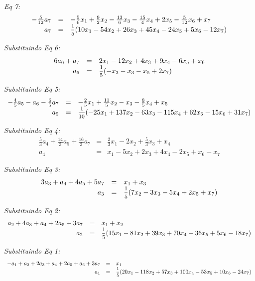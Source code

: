 \documentclass[11pt]{article}
\newenvironment{question}[1]
  {\par\addvspace{\medskipamount}
   \noindent\makebox[0pt][r]{\textbf{#1)} }\ignorespaces}
  {\par\addvspace{\medskipamount}}
\begin{document}
\begin{question}{4}
\bigskip
\textit{Eq 7:}
$$
\begin{array}{rcl}
    -\frac{5}{12}a_7 &= &-\frac{5}{6}x_1 + \frac{9}{2}x_2 - \frac{13}{6}x_3 - \frac{15}{4}x_4 + 2 x_5 - \frac{5}{12}x_6 + x_7\\
    a_7 &= &\mfrac{1}{5}(10x_1-54x_2+26x_3+45x_4-24x_5+5x_6-12x_7)
\end{array}
$$

\bigskip
\textit{Substituindo Eq 6:}
$$
\begin{array}{rcl}
    6a_6 + a_7 &= &2 x_1 - 12 x_2 + 4 x_3 + 9 x_4 - 6 x_5 + x_6\\
    a_6 &= &\mfrac{1}{5}(-x_2-x_3-x_5+2x_7)
\end{array}
$$

\bigskip
\textit{Substituindo Eq 5:}
$$
\begin{array}{rcl}
    -\frac{4}{5}a_5 - a_6 - \frac{6}{5}a_7 &= &-\frac{2}{5}x_1 + \frac{11}{5}x_2 - x_3 - \frac{8}{5}x_4 + x_5\\
    a_5 &= &\mfrac{1}{10}(-25x_1+137x_2-63x_3-115x_4+62x_5-15x_6+31x_7)
\end{array}
$$

\bigskip
\textit{Substituindo Eq 4:}
$$
\begin{array}{rcl}
    \frac{5}{3}a_4 + \frac{14}{3}a_5 + \frac{16}{3}a_7 &= &\frac{2}{3}x_1 - 2 x_2 + \frac{5}{3}x_3 + x_4\\
    a_4 &= &x_1-5x_2+2x_3+4x_4-2x_5+x_6-x_7
\end{array}
$$

\bigskip
\textit{Substituindo Eq 3:}
$$
\begin{array}{rcl}
    3a_3 + a_4 + 4a_5 + 5a_7 &= &x_1 + x_3\\
    a_3 &= &\mfrac{1}{5}(7x_2-3x_3-5x_4+2x_5+x_7)
\end{array}
$$

\bigskip
\textit{Substituindo Eq 2:}
$$
\begin{array}{rcl}
    a_2 + 4a_3 + a_4 + 2a_5 + 3a_7 &= &x_1 + x_2\\
    a_2 &= &\mfrac{1}{5}(15x_1-81x_2+39x_3+70x_4-36x_5+5x_6-18x_7)
\end{array}
$$

\bigskip
\textit{Substituindo Eq 1:}
$$
\begin{array}{rcl}
    -a_1 + a_2 + 2a_3 + a_4 + 2a_5 + a_6 + 3a_7 &= &x_1\\
    a_1 &= &\mfrac{1}{5}(20x_1-118x_2+57x_3+100x_4-53x_5+10x_6-24x_7)
\end{array}
$$


\end{question}
\end{document}
